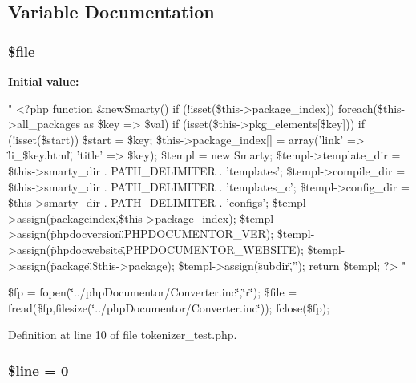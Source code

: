 \subsection{\-Variable \-Documentation}
\hypertarget{tokenizer__test_8php_aa1bfbd27060176201b271918dff57e8f}{
\subsubsection[{\$file}]{\setlength{\rightskip}{0pt plus 5cm}\$file}}\label{tokenizer__test_8php_aa1bfbd27060176201b271918dff57e8f}
{\bfseries \-Initial value\-:}
\begin{DoxyCode}
"
<?php
    function &newSmarty()
    {
        if (!isset(\$this->package_index))
        foreach(\$this->all_packages as \$key => \$val)
        {
            if (isset(\$this->pkg_elements[\$key]))
            {
                if (!isset(\$start)) \$start = \$key;
                \$this->package_index[] = array('link' => \"li_\$key.html\",
       'title' => \$key);
            }
        }
        \$templ = new Smarty;
        \$templ->template_dir = \$this->smarty_dir . PATH_DELIMITER .
       'templates';
        \$templ->compile_dir = \$this->smarty_dir . PATH_DELIMITER .
       'templates_c';
        \$templ->config_dir = \$this->smarty_dir . PATH_DELIMITER . 'configs';
        \$templ->assign(\"packageindex\",\$this->package_index);
        \$templ->assign(\"phpdocversion\",PHPDOCUMENTOR_VER);
        \$templ->assign(\"phpdocwebsite\",PHPDOCUMENTOR_WEBSITE);
        \$templ->assign(\"package\",\$this->package);
        \$templ->assign(\"subdir\",'');
        return \$templ;
    }
?>
"
\end{DoxyCode}
\$fp = fopen(\char`\"{}../php\-Documentor/\-Converter.\-inc\char`\"{},\char`\"{}r\char`\"{}); \$file = fread(\$fp,filesize(\char`\"{}../php\-Documentor/\-Converter.\-inc\char`\"{})); fclose(\$fp); 

\-Definition at line 10 of file tokenizer\-\_\-test.\-php.

\hypertarget{tokenizer__test_8php_a52f469b0182d9abac2d0f20548680c9c}{
\subsubsection[{\$line}]{\setlength{\rightskip}{0pt plus 5cm}\$line = 0}}\label{tokenizer__test_8php_a52f469b0182d9abac2d0f20548680c9c}


